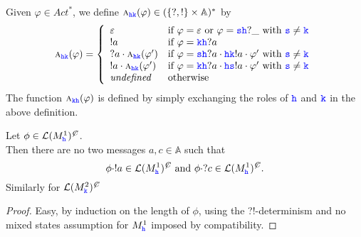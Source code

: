 \begin{definition}
Given $\varphi\in\textit{Act}^*$, we define $\symb{\HH\KK}{\varphi}\in (\Set{?,!}\times\mathbb{A})^* $  by 
$$\symb{\HH\KK}{\varphi} = \left\{\begin{array}{ll}                                             
                                                \varepsilon & \text{if }  \varphi  = \varepsilon  \text{ or } \varphi = \tts\HH?\_ \text{ with } \tts\neq\KK    \\
                                                !a & \text{if }  \varphi = \KK\HH?a \\
                                               ?a\cdot\symb{\HH\KK}{\varphi'} & 
                                                      \text{if } \varphi= \tts\HH?a \cdot \HH\KK!a \cdot \varphi' \text{ with } \tts\neq\KK\\
                                                !a\cdot\symb{\HH\KK}{\varphi'}   & 
                                                         \text{if } \varphi= \KK\HH?a \cdot \HH\tts!a \cdot \varphi'  \text{ with } \tts\neq\KK\\
                                               \textit{undefined}  & \text{otherwise } 
                                      \end{array} \right. 
$$
The function $\symb{\KK\HH}{\varphi}$ is defined by simply exchanging the roles of $\HH$ and $\KK$ in the above definition.
\end{definition}

\begin{lemma}
\label{lem:notwomarks}
Let $\phi\in\lang{M^1_\HH}^\mC$.\\
Then there are no two messages $a,c\in \mathbb{A}$ such that \\
$$\phi\cdot !a\in\lang{M^1_\HH}^\mC \mathrm{~and~}  \phi\cdot ?c\in\lang{M^1_\HH}^\mC.$$
Similarly for $\lang{M^2_\KK}^\mC$
\end{lemma}
\begin{proof}
Easy, by induction on the length of $\phi$, 
using the
?!-determinism and no mixed states assumption for
$M^1_\HH$ imposed by compatibility.

\end{proof}

